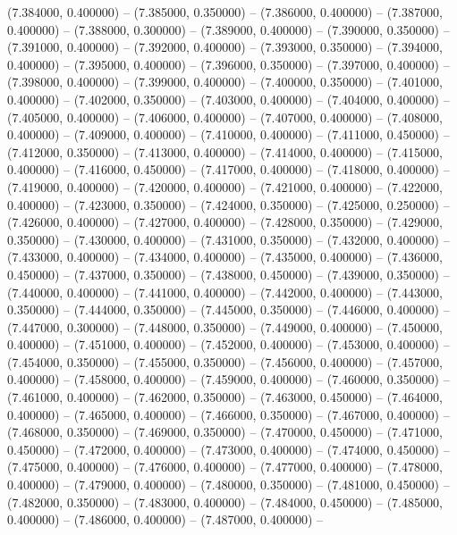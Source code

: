 (7.384000, 0.400000) -- 
(7.385000, 0.350000) -- 
(7.386000, 0.400000) -- 
(7.387000, 0.400000) -- 
(7.388000, 0.300000) -- 
(7.389000, 0.400000) -- 
(7.390000, 0.350000) -- 
(7.391000, 0.400000) -- 
(7.392000, 0.400000) -- 
(7.393000, 0.350000) -- 
(7.394000, 0.400000) -- 
(7.395000, 0.400000) -- 
(7.396000, 0.350000) -- 
(7.397000, 0.400000) -- 
(7.398000, 0.400000) -- 
(7.399000, 0.400000) -- 
(7.400000, 0.350000) -- 
(7.401000, 0.400000) -- 
(7.402000, 0.350000) -- 
(7.403000, 0.400000) -- 
(7.404000, 0.400000) -- 
(7.405000, 0.400000) -- 
(7.406000, 0.400000) -- 
(7.407000, 0.400000) -- 
(7.408000, 0.400000) -- 
(7.409000, 0.400000) -- 
(7.410000, 0.400000) -- 
(7.411000, 0.450000) -- 
(7.412000, 0.350000) -- 
(7.413000, 0.400000) -- 
(7.414000, 0.400000) -- 
(7.415000, 0.400000) -- 
(7.416000, 0.450000) -- 
(7.417000, 0.400000) -- 
(7.418000, 0.400000) -- 
(7.419000, 0.400000) -- 
(7.420000, 0.400000) -- 
(7.421000, 0.400000) -- 
(7.422000, 0.400000) -- 
(7.423000, 0.350000) -- 
(7.424000, 0.350000) -- 
(7.425000, 0.250000) -- 
(7.426000, 0.400000) -- 
(7.427000, 0.400000) -- 
(7.428000, 0.350000) -- 
(7.429000, 0.350000) -- 
(7.430000, 0.400000) -- 
(7.431000, 0.350000) -- 
(7.432000, 0.400000) -- 
(7.433000, 0.400000) -- 
(7.434000, 0.400000) -- 
(7.435000, 0.400000) -- 
(7.436000, 0.450000) -- 
(7.437000, 0.350000) -- 
(7.438000, 0.450000) -- 
(7.439000, 0.350000) -- 
(7.440000, 0.400000) -- 
(7.441000, 0.400000) -- 
(7.442000, 0.400000) -- 
(7.443000, 0.350000) -- 
(7.444000, 0.350000) -- 
(7.445000, 0.350000) -- 
(7.446000, 0.400000) -- 
(7.447000, 0.300000) -- 
(7.448000, 0.350000) -- 
(7.449000, 0.400000) -- 
(7.450000, 0.400000) -- 
(7.451000, 0.400000) -- 
(7.452000, 0.400000) -- 
(7.453000, 0.400000) -- 
(7.454000, 0.350000) -- 
(7.455000, 0.350000) -- 
(7.456000, 0.400000) -- 
(7.457000, 0.400000) -- 
(7.458000, 0.400000) -- 
(7.459000, 0.400000) -- 
(7.460000, 0.350000) -- 
(7.461000, 0.400000) -- 
(7.462000, 0.350000) -- 
(7.463000, 0.450000) -- 
(7.464000, 0.400000) -- 
(7.465000, 0.400000) -- 
(7.466000, 0.350000) -- 
(7.467000, 0.400000) -- 
(7.468000, 0.350000) -- 
(7.469000, 0.350000) -- 
(7.470000, 0.450000) -- 
(7.471000, 0.450000) -- 
(7.472000, 0.400000) -- 
(7.473000, 0.400000) -- 
(7.474000, 0.450000) -- 
(7.475000, 0.400000) -- 
(7.476000, 0.400000) -- 
(7.477000, 0.400000) -- 
(7.478000, 0.400000) -- 
(7.479000, 0.400000) -- 
(7.480000, 0.350000) -- 
(7.481000, 0.450000) -- 
(7.482000, 0.350000) -- 
(7.483000, 0.400000) -- 
(7.484000, 0.450000) -- 
(7.485000, 0.400000) -- 
(7.486000, 0.400000) -- 
(7.487000, 0.400000) -- 
